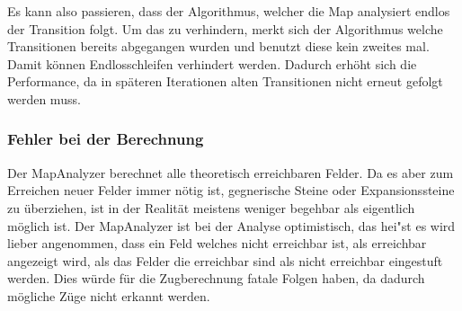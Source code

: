 Es kann also passieren, dass der Algorithmus, welcher die Map analysiert endlos der Transition folgt.
Um das zu verhindern, merkt sich der Algorithmus welche Transitionen bereits abgegangen wurden und benutzt diese kein zweites mal.
Damit k\"onnen Endlosschleifen verhindert werden.
Dadurch erh\"oht sich die Performance, da in sp\"ateren Iterationen alten Transitionen nicht erneut gefolgt werden muss.

\subsubsection{Fehler bei der Berechnung}\label{subsubsec:fehlerhafte-berechnung}
Der MapAnalyzer berechnet alle theoretisch erreichbaren Felder.
Da es aber zum Erreichen neuer Felder immer n\"otig ist, gegnerische Steine oder Expansionssteine zu \"uberziehen, ist in der Realit\"at meistens weniger begehbar als eigentlich m\"oglich ist.
Der MapAnalyzer ist bei der Analyse optimistisch, das hei"st es wird lieber angenommen, dass ein Feld welches nicht erreichbar ist, als erreichbar angezeigt wird, als das Felder die erreichbar sind als nicht erreichbar eingestuft werden.
Dies w\"urde f\"ur die Zugberechnung fatale Folgen haben, da dadurch m\"ogliche Z\"uge nicht erkannt werden.

\bigskip
\newpage
